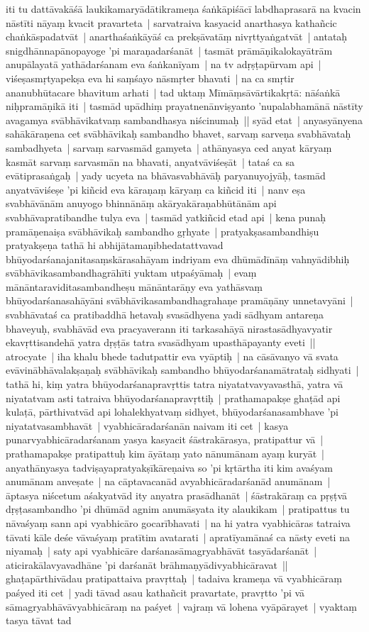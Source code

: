 \documentclass[article,12pt,a4paper]{memoir}%
\begin{document}
	  
	  \pstart \leavevmode%
	iti tu dattāvakāśā laukikamaryādātikrameṇa śaṅkāpiśācī labdhaprasarā na kvacin nāstīti nāyaṃ kvacit pravarteta | sarvatraiva kasyacid anarthasya kathañcic chaṅkāspadatvāt | anarthaśaṅkāyāś ca prekṣāvatāṃ nivṛttyaṅgatvāt | antataḥ snigdhānnapānopayoge 'pi maraṇadarśanāt | tasmāt prāmāṇikalokayātrām anupālayatā yathādarśanam eva śaṅkanīyam | na tv adṛṣṭapūrvam api | viśeṣasmṛtyapekṣa eva hi saṃśayo nāsmṛter bhavati | na ca smṛtir ananubhūtacare bhavitum arhati | tad uktaṃ Mīmāṃsāvārtikakṛtā: nāśaṅkā niḥpramāṇikā iti | tasmād upādhiṃ prayatnenānviṣyanto 'nupalabhamānā nāstīty avagamya svābhāvikatvaṃ sambandhasya niścinumaḥ || \label{thakur75-107.16} syād etat | anyasyānyena sahākāraṇena cet svābhāvikaḥ sambandho bhavet, sarvaṃ sarveṇa svabhāvataḥ sambadhyeta | sarvaṃ sarvasmād gamyeta | athānyasya ced anyat kāryaṃ kasmāt sarvaṃ sarvasmān na bhavati, anyatvāviśeṣāt | tataś ca sa evātiprasaṅgaḥ | yady ucyeta na bhāvasvabhāvāḥ paryanuyojyāḥ, tasmād anyatvāviśeṣe 'pi kiñcid eva kāraṇaṃ kāryaṃ ca kiñcid iti | nanv eṣa svabhāvānām anuyogo bhinnānāṃ akāryakāraṇabhūtānām api svabhāvapratibandhe tulya eva | tasmād yatkiñcid etad api | kena punaḥ pramāṇenaiṣa svābhāvikaḥ sambandho gṛhyate | pratyakṣasambandhiṣu pratyakṣeṇa tathā hi abhijātamaṇibhedatattvavad bhūyodarśanajanitasaṃskārasahāyam indriyam eva dhūmādīnāṃ vahnyādibhiḥ svābhāvikasambandhagrāhīti yuktam utpaśyāmaḥ | evaṃ mānāntaraviditasambandheṣu mānāntarāṇy eva yathāsvaṃ bhūyodarśanasahāyāni svābhāvikasambandhagrahaṇe pramāṇāny unnetavyāni | svabhāvataś ca pratibaddhā hetavaḥ svasādhyena yadi sādhyam antareṇa bhaveyuḥ, svabhāvād eva pracyaverann iti tarkasahāyā nirastasādhyavyatir ekavṛttisandehā yatra dṛṣṭās tatra svasādhyam upasthāpayanty eveti || \label{thakur75-108.3} atrocyate | iha khalu bhede tadutpattir eva vyāptiḥ | na cāsāvanyo vā svata evāvinābhāvalakṣaṇaḥ svābhāvikaḥ sambandho bhūyodarśanamātrataḥ sidhyati | tathā hi, kiṃ yatra bhūyodarśanapravṛttis tatra niyatatvavyavasthā, yatra vā niyatatvam asti tatraiva bhūyodarśanapravṛttiḥ | prathamapakṣe ghaṭād api kulaṭā, pārthivatvād api lohalekhyatvaṃ sidhyet, bhūyodarśanasambhave 'pi niyatatvasambhavāt | \label{thakur75-108.8} vyabhicāradarśanān naivam iti cet | kasya punarvyabhicāradarśanam yasya kasyacit śāstrakārasya, pratipattur vā | prathamapakṣe pratipattuḥ kim āyātaṃ yato nānumānam ayaṃ kuryāt | anyathānyasya tadviṣayapratyakṣīkāreṇaiva so 'pi kṛtārtha iti kim avaśyam anumānam anveṣate | na cāptavacanād avyabhicāradarśanād anumānam | āptasya niścetum aśakyatvād ity anyatra prasādhanāt | śāstrakāraṃ ca pṛṣṭvā dṛṣṭasambandho 'pi dhūmād agnim anumāsyata ity alaukikam | pratipattus tu nāvaśyaṃ sann api vyabhicāro gocarībhavati | na hi yatra vyabhicāras tatraiva tāvati kāle deśe vāvaśyaṃ pratītim avatarati | apratīyamānaś ca nāsty eveti na niyamaḥ | saty api vyabhicāre darśanasāmagryabhāvāt tasyādarśanāt | aticirakālavyavadhāne 'pi darśanāt brāhmaṇyādivyabhicāravat || \label{thakur75-108.18} ghaṭapārthivādau pratipattaiva pravṛttaḥ | tadaiva krameṇa vā vyabhicāraṃ paśyed iti cet | yadi tāvad asau kathañcit pravartate, pravṛtto 'pi vā sāmagryabhāvāvyabhicāraṃ na paśyet | vajraṃ vā lohena vyāpārayet | vyaktaṃ tasya tāvat tad 
\end{document}
